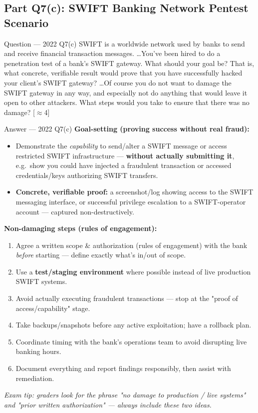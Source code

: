 \documentclass[12pt,a4paper]{article}
\begin{document}
\subsection{Part Q7(c): SWIFT Banking Network Pentest Scenario}
\begin{qbox}{Question --- 2022 Q7(c)}
SWIFT is a worldwide network used by banks to send and receive financial transaction messages. \dots You've been hired to do a penetration test of a bank's SWIFT gateway. What should your goal be? That is, what concrete, verifiable result would prove that you have successfully hacked your client's SWIFT gateway? \dots Of course you do not want to damage the SWIFT gateway in any way, and especially not do anything that would leave it open to other attackers. What steps would you take to ensure that there was no damage? \hfill [$\approx$4]
\end{qbox}
\begin{solbox}{Answer --- 2022 Q7(c)}
\textbf{Goal-setting (proving success without real fraud):}
\begin{itemize}[noitemsep]
  \item Demonstrate the \emph{capability} to send/alter a SWIFT message or access restricted SWIFT infrastructure --- \textbf{without actually submitting it}, e.g.\ show you could have injected a fraudulent transaction or accessed credentials/keys authorizing SWIFT transfers.
  \item \textbf{Concrete, verifiable proof:} a screenshot/log showing access to the SWIFT messaging interface, or successful privilege escalation to a SWIFT-operator account --- captured non-destructively.
\end{itemize}

\textbf{Non-damaging steps (rules of engagement):}
\begin{enumerate}[noitemsep]
  \item Agree a written scope \& authorization (rules of engagement) with the bank \emph{before} starting --- define exactly what's in/out of scope.
  \item Use a \textbf{test/staging environment} where possible instead of live production SWIFT systems.
  \item Avoid actually executing fraudulent transactions --- stop at the "proof of access/capability" stage.
  \item Take backups/snapshots before any active exploitation; have a rollback plan.
  \item Coordinate timing with the bank's operations team to avoid disrupting live banking hours.
  \item Document everything and report findings responsibly, then assist with remediation.
\end{enumerate}
\textit{Exam tip: graders look for the phrase "no damage to production / live systems" and "prior written authorization" --- always include these two ideas.}
\end{solbox}
\end{document}
